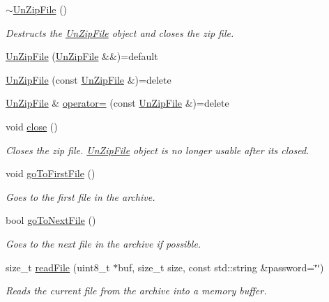 \begin{DoxyCompactItemize}
\hyperlink{group___utility_module_ga325131b751ccc5a391367afb09084036}{$\sim$\+Un\+Zip\+File} ()
\begin{DoxyCompactList}\small\item\em Destructs the \hyperlink{classdg_1_1deepcore_1_1_un_zip_file}{Un\+Zip\+File} object and closes the zip file. \end{DoxyCompactList}\item 
\hyperlink{classdg_1_1deepcore_1_1_un_zip_file_aae918141726089605648d22560cfce7d}{Un\+Zip\+File} (\hyperlink{classdg_1_1deepcore_1_1_un_zip_file}{Un\+Zip\+File} \&\&)=default
\item 
\hyperlink{classdg_1_1deepcore_1_1_un_zip_file_a1c1da90565db56d9d8eed0f10a8a8b2e}{Un\+Zip\+File} (const \hyperlink{classdg_1_1deepcore_1_1_un_zip_file}{Un\+Zip\+File} \&)=delete
\item 
\hyperlink{classdg_1_1deepcore_1_1_un_zip_file}{Un\+Zip\+File} \& \hyperlink{classdg_1_1deepcore_1_1_un_zip_file_af550bb1d0ede835cd3b6c7a1c5d94239}{operator=} (const \hyperlink{classdg_1_1deepcore_1_1_un_zip_file}{Un\+Zip\+File} \&)=delete
\item 
void \hyperlink{group___utility_module_ga6f28d71dffa80123aaa68ebf44783d0c}{close} ()
\begin{DoxyCompactList}\small\item\em Closes the zip file. \hyperlink{classdg_1_1deepcore_1_1_un_zip_file}{Un\+Zip\+File} object is no longer usable after it\textquotesingle{}s closed. \end{DoxyCompactList}\item 
void \hyperlink{group___utility_module_ga065f405804b43cb3fdabca1fe7bd095a}{go\+To\+First\+File} ()
\begin{DoxyCompactList}\small\item\em Goes to the first file in the archive. \end{DoxyCompactList}\item 
bool \hyperlink{group___utility_module_ga88b7a33f99cbcc1748da060b7233cb9a}{go\+To\+Next\+File} ()
\begin{DoxyCompactList}\small\item\em Goes to the next file in the archive if possible. \end{DoxyCompactList}\item 
size\+\_\+t \hyperlink{group___utility_module_ga16985655d6b3bf1f05330d54ca736b0e}{read\+File} (uint8\+\_\+t $\ast$buf, size\+\_\+t size, const std\+::string \&password=\char`\"{}\char`\"{})
\begin{DoxyCompactList}\small\item\em Reads the current file from the archive into a memory buffer. \end{DoxyCompactList}\item 

\end{DoxyCompactItemize}
